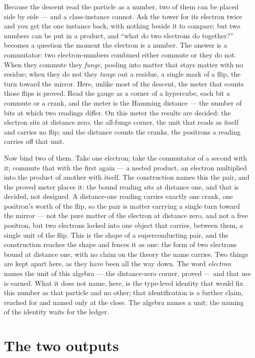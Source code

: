 Because the descent read the particle as a number, two of them can be placed side by side --- and a
class-instance cannot. Ask the tower for its electron twice and you get the one instance back, with nothing
beside it to compare; but two numbers can be put in a product, and ``what do two electrons do together?''
becomes a question the moment the electron is a number. The answer is a commutator: two electron-numbers
combined either commute or they do not. When they commute they \emph{funge}, pooling into matter that stays
matter with no residue; when they do not they \emph{tange} out a residue, a single mark of a flip, the turn
toward the mirror. Here, unlike most of the descent, the meter that counts those flips is proved. Read the
gauge as a corner of a hypercube, each bit a commute or a crank, and the meter is the Hamming distance ---
the number of bits at which two readings differ. On this meter the results are decided: the electron sits at
distance zero, the all-funge corner, the unit that reads as itself and carries no flip; and the distance
counts the cranks, the positrons a reading carries off that unit.

Now bind two of them. Take one electron; take the commutator of a second with it; commute that with the
first again --- a nested product, an electron multiplied into the product of another with itself. The
construction names this the pair, and the proved meter places it: the bound reading sits at distance one, and
that is decided, not designed. A distance-one reading carries exactly one crank, one positron's worth of the
flip, so the pair is matter carrying a single turn toward the mirror --- not the pure matter of the electron
at distance zero, and not a free positron, but two electrons locked into one object that carries, between
them, a single unit of the flip. This is the shape of a superconducting pair, and the construction reaches
the shape and fences it as one: the form of two electrons bound at distance one, with no claim on the theory
the name carries. Two things are kept apart here, as they have been all the way down. The word
\emph{electron} names the unit of this algebra --- the distance-zero corner, proved --- and that use is
earned. What it does not name, here, is the type-level identity that would fix this number as that particle
and no other; that identification is a further claim, reached for and named only at the close. The algebra
names a unit; the naming of the identity waits for the ledger.

\section{The two outputs}
\label{se:the-two-outputs}

